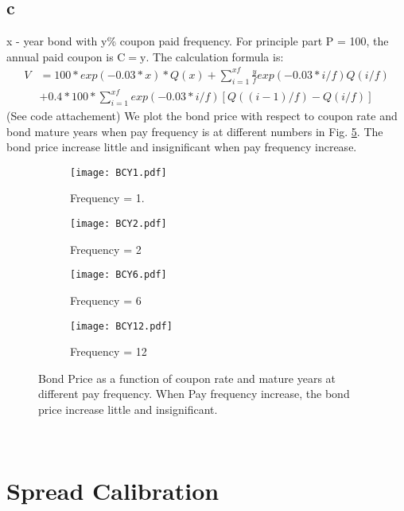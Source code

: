 \documentclass[a4paper,11pt]{article} %
\begin{document}
\subsection{c}
x - year bond with y\% coupon paid frequency. For principle part P = 100, the annual paid coupon is $\mathrm{C = y}$. The calculation formula is:
\begin{align*}
	V &= 100 * exp(-0.03 * x) * Q(x) + \sum_{i=1}^{xf}\frac{y}{f}exp(-0.03 * i / f) Q(i/f) \\
	&+ 0.4*100*\sum_{i=1}^{xf}exp(-0.03*i/f)[Q((i-1)/f) - Q(i/f)]
\end{align*}
(See code attachement)
We plot the bond price with respect to coupon rate and bond mature years when pay frequency is at different numbers in Fig. \ref{BCY}. The bond price increase little and insignificant when pay frequency increase.
\begin{figure}[hbt]
	\centering
	\begin{subfigure}{0.45\textwidth}
		\texttt{[image: BCY1.pdf]}
		\caption{Frequency = 1.}
		\label{fig:first}
	\end{subfigure}
	\hfill
	\begin{subfigure}{0.45\textwidth}
		\texttt{[image: BCY2.pdf]}
		\caption{Frequency = 2}
		\label{fig:second}
	\end{subfigure}
	\hfill
	\begin{subfigure}{0.45\textwidth}
		\texttt{[image: BCY6.pdf]}
		\caption{Frequency = 6}
		\label{fig:third}
	\end{subfigure}
	\hfill
	\begin{subfigure}{0.45\textwidth}
	\texttt{[image: BCY12.pdf]}
	\caption{Frequency = 12}
	\label{ffig:four}
\end{subfigure}
	\caption{Bond Price as a function of coupon rate and mature years at different pay frequency. When Pay frequency increase, the bond price increase little and insignificant. }
	\label{BCY}
\end{figure}\\
\section{Spread Calibration}
\end{document}
